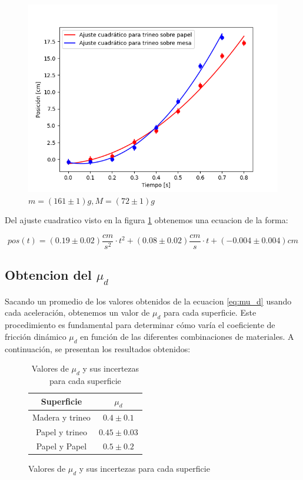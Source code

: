\documentclass[12pt,a4]{article}
\begin{document}
\begin{figure}[H]
    \centering
    \includegraphics{ajuste2_PisoHojaM_OP.png}
    \caption{$m = (161 \pm 1) g, M = (72 \pm 1) g$}
    \label{fig:M_OP piso hoja}
\end{figure}


Del ajuste cuadratico visto en la figura \ref{fig:M_OP piso hoja} obtenemos una ecuacion de la forma:

\[
pos(t) = (0.19 \pm 0.02) \frac{cm}{s^2} \cdot t^2 + (0.08 \pm 0.02)\frac{cm}{s} \cdot t + (-0.004 \pm 0.004) cm
\]

\subsection{Obtencion del $\mu_d$}

Sacando un promedio de los valores obtenidos de la ecuacion \ref{eq:mu_d} usando cada aceleración, obtenemos un valor de $\mu_d$ para cada superficie. Este procedimiento es fundamental para determinar cómo varía el coeficiente de fricción dinámico $\mu_d$ en función de las diferentes combinaciones de materiales. A continuación, se presentan los resultados obtenidos:
\begin{figure}[H]
    \begin{table}[H]
        \centering
        \begin{tabular}{|c|c|}
            \hline
            \textbf{Superficie} & \textbf{$\mu_d$}\\
            \hline
            Madera y trineo & $0.4 \pm 0.1$\\
            Papel y trineo & $0.45 \pm 0.03$ \\
            Papel y Papel & $0.5 \pm 0.2$ \\
            \hline
        \end{tabular}
        \caption{Valores de $\mu_d$ y sus incertezas para cada superficie}
        \label{tab:mu_d}
    \end{table}
\end{figure}
\end{document}
